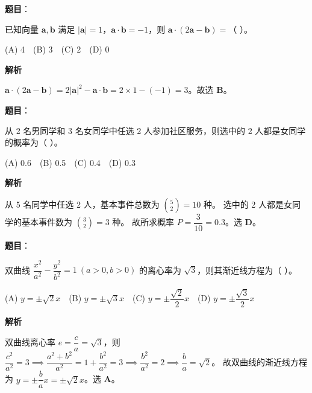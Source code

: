 \begin{answer}

\textbf{题目}：

已知向量 $\boldsymbol a,\boldsymbol b$ 满足 $|\boldsymbol a|=1$，$\boldsymbol a\cdot\boldsymbol b=-1$，则 $\boldsymbol a\cdot(2\boldsymbol a-\boldsymbol b)=$（ ）。

(A) 4　(B) 3　(C) 2　(D) 0

\textbf{解析}

$\boldsymbol a\cdot(2\boldsymbol a-\boldsymbol b) = 2|\boldsymbol a|^2 - \boldsymbol a\cdot\boldsymbol b = 2\times 1 - (-1) = 3$。故选 \textbf{B}。


\end{answer}
\begin{answer}

\textbf{题目}：

从 2 名男同学和 3 名女同学中任选 2 人参加社区服务，则选中的 2 人都是女同学的概率为（ ）。

(A) 0.6　(B) 0.5　(C) 0.4　(D) 0.3

\textbf{解析}

从 5 名同学中任选 2 人，基本事件总数为 $\binom52=10$ 种。
选中的 2 人都是女同学的基本事件数为 $\binom32=3$ 种。
故所求概率 $P = \dfrac{3}{10} = 0.3$。选 \textbf{D}。


\end{answer}
\begin{answer}

\textbf{题目}：

双曲线 $\dfrac{x^2}{a^2}-\dfrac{y^2}{b^2}=1\ (a>0,b>0)$ 的离心率为 $\sqrt3$，则其渐近线方程为（ ）。

(A) $y=\pm\sqrt2 x$　(B) $y=\pm\sqrt3 x$　(C) $y=\pm\dfrac{\sqrt2}{2}x$　(D) $y=\pm\dfrac{\sqrt3}{2}x$

\textbf{解析}

双曲线离心率 $e = \dfrac ca = \sqrt3$，则 $\dfrac{c^2}{a^2} = 3 \implies \dfrac{a^2+b^2}{a^2} = 1+\dfrac{b^2}{a^2} = 3 \implies \dfrac{b^2}{a^2} = 2 \implies \dfrac ba = \sqrt2$。
故双曲线的渐近线方程为 $y = \pm\dfrac ba x = \pm\sqrt2 x$。选 \textbf{A}。


\end{answer}
